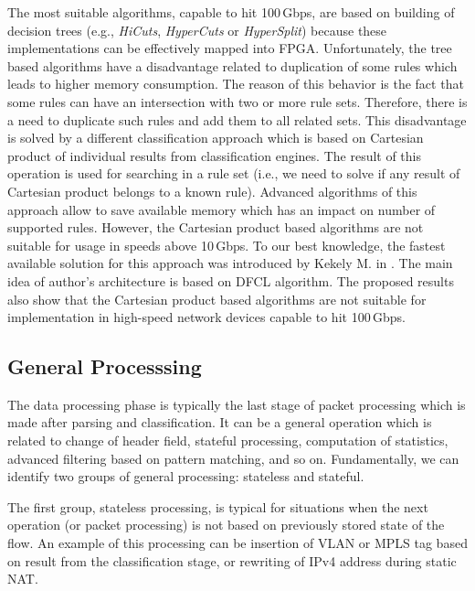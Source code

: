 The most suitable algorithms, capable to hit 100\,Gbps, are based on building of decision
trees (e.g., \textit{HiCuts}, \textit{HyperCuts} or \textit{HyperSplit}) because these implementations can be effectively mapped into FPGA.
Unfortunately, the tree based algorithms have a disadvantage related to duplication of some rules which leads to higher memory consumption.
The reason of this behavior is the fact that some rules can have an intersection with two or more rule sets. Therefore, there is a need to duplicate
such rules and add them to all related sets. This disadvantage is solved by a different classification approach which is based on Cartesian
product of individual results from classification engines. The result of this operation is used for searching in a rule set (i.e., we need 
to solve if any result of Cartesian product belongs to a known rule). Advanced algorithms of this approach allow to save available memory
which has an impact on number of supported rules. However, the Cartesian product based algorithms are not suitable for usage in speeds above 10\,Gbps.
To our best knowledge, the fastest available solution for this approach was introduced by Kekely M. in \cite{KekelyP4}.
The main idea of author's architecture is based on DFCL \cite{TaylorDFCL} algorithm.
The proposed results also show that the Cartesian product based algorithms are not suitable for implementation in high-speed network devices 
capable to hit 100\,Gbps.

\subsection{General Processsing}
\label{sec:dataProcessing}

The data processing phase is typically the last stage of packet processing which is made after parsing and classification. 
It can be a general operation which is related to change of header field, stateful processing, computation of statistics, advanced 
filtering based on pattern matching, and so on. Fundamentally, we can identify two groups of general processing: 
stateless and stateful.

The first group, stateless processing, is typical for situations when the next operation (or packet processing) is not 
based on previously stored state of the flow. An example of this processing can be insertion of VLAN or MPLS tag based on result 
from the classification stage, or rewriting of IPv4 address during static NAT.

